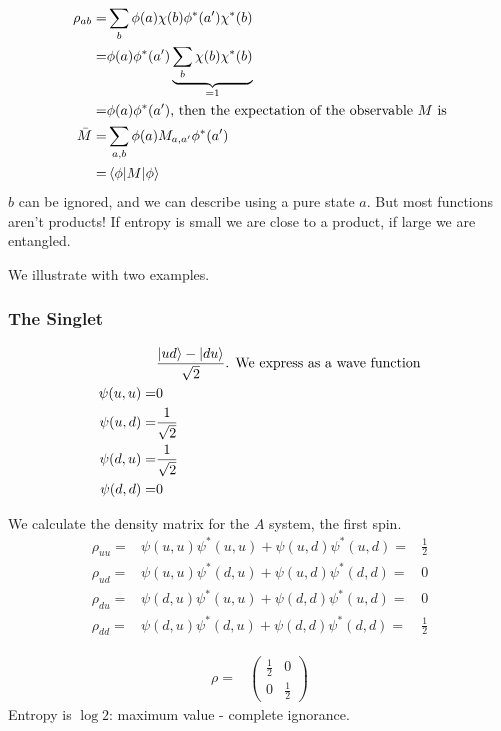 \documentclass[]{article}
\begin{document}
\begin{align*}
	\rho_{ab} =& \sum_b \phi(a) \chi(b) \phi^*(a^\prime) \chi^*(b)\\
	=& \phi(a) \phi^*(a^\prime) \underbrace{\sum_b  \chi(b)  \chi^*(b)}_\text{=1}\\
	=& \phi(a) \phi^*(a^\prime) \text{, then the expectation of the observable $M$ is}\\
	\bar{M} =& \sum_{a,b}\phi(a) M_{a,a^\prime}\phi^*(a^\prime)\\
	=& \braket{\phi\vert M\vert \phi}
\end{align*}
$b$ can be ignored, and we can describe using a pure state $a$. But most functions aren't products! If entropy is small we are close to a product, if large we are entangled.

We illustrate with two examples.

\subsubsection{The Singlet}

\begin{align*}
	&\frac{\ket{ud}-\ket{du}}{\sqrt{2}} \text{. We express as a wave function}\\
	\psi(u,u) =& 0\\
	\psi(u,d) =& \frac{1}{\sqrt{2}}\\
	\psi(d,u) =& \frac{1}{\sqrt{2}}\\
	\psi(d,d) =& 0
\end{align*}

We calculate the density matrix for the $A$ system, the first spin.
\begin{align*}
	\rho_{uu} =& \psi(u,u)\psi^*(u,u) +  \psi(u,d)\psi^*(u,d) =& \frac{1}{2}\\
	\rho_{ud} =& \psi(u,u)\psi^*(d,u) +  \psi(u,d)\psi^*(d,d) =& 0\\
	\rho_{du} =& \psi(d,u)\psi^*(u,u) +  \psi(d,d)\psi^*(u,d) =& 0\\
	\rho_{dd} =& \psi(d,u)\psi^*(d,u) +  \psi(d,d)\psi^*(d,d) =& \frac{1}{2}
\end{align*}

\begin{align*}
	\rho =& \begin{pmatrix}
		\frac{1} {2}&0\\
		0 &\frac{1}{2}
	\end{pmatrix}
\end{align*}
Entropy is $\log{2}$: maximum value - complete ignorance.
\end{document}
